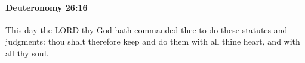 
		\paragraph{Deuteronomy 26:16} %
			\label{DEUTERONOMY-26-16}

			This day the LORD thy God hath commanded thee to do these statutes and judgments: thou shalt therefore keep and do them with all thine heart, and with all thy soul.


